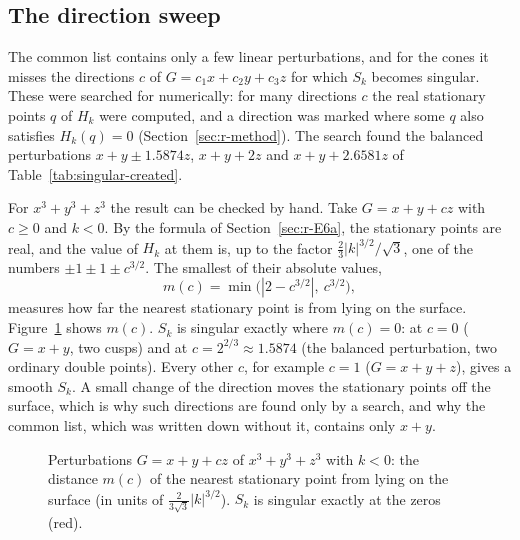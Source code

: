 \documentclass[12pt, a4paper]{article}
\theoremstyle{plain}
\theoremstyle{definition}
\theoremstyle{remark}
\theoremstyle{definition}
\begin{document}
\subsection{The direction sweep}
\label{sec:r-sweep}

The common list contains only a few linear perturbations, and for the cones it
misses the directions $c$ of $G=c_1x+c_2y+c_3z$ for which $S_k$ becomes singular.
These were searched for numerically: for many directions $c$ the real stationary
points $q$ of $H_k$ were computed, and a direction was marked where some $q$ also
satisfies $H_k(q)=0$ (Section~\ref{sec:r-method}). The search found the balanced
perturbations $x+y\pm1.5874z$, $x+y+2z$ and $x+y+2.6581z$ of
Table~\ref{tab:singular-created}.

For $x^3+y^3+z^3$ the result can be checked by hand. Take $G=x+y+cz$ with $c\ge0$
and $k<0$. By the formula of Section~\ref{sec:r-E6a}, the stationary points are real,
and the value of $H_k$ at them is, up to the factor $\tfrac{2}{3}|k|^{3/2}/\sqrt3$,
one of the numbers $\pm1\pm1\pm c^{3/2}$. The smallest of their absolute values,
\[
m(c)=\min\big(|2-c^{3/2}|,\ c^{3/2}\big),
\]
measures how far the nearest stationary point is from lying on the surface.
Figure~\ref{fig:r-sweep} shows $m(c)$. $S_k$ is singular exactly where $m(c)=0$:
at $c=0$ ($G=x+y$, two cusps) and at $c=2^{2/3}\approx1.5874$ (the balanced
perturbation, two ordinary double points). Every other $c$, for example $c=1$
($G=x+y+z$), gives a smooth $S_k$. A small change of the direction moves the
stationary points off the surface, which is why such directions are found only by a
search, and why the common list, which was written down without it, contains only
$x+y$.

\begin{figure}[!h]
\centering
{}
\caption{Perturbations $G=x+y+cz$ of $x^3+y^3+z^3$ with $k<0$: the distance $m(c)$ of
the nearest stationary point from lying on the surface (in units of
$\tfrac{2}{3\sqrt3}|k|^{3/2}$). $S_k$ is singular exactly at the zeros (red).}
\label{fig:r-sweep}
\end{figure}
\end{document}

